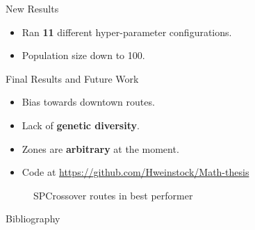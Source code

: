 \documentclass{beamer}
\begin{document}
\begin{frame}{New Results}
\begin{itemize}
    \item Ran \textbf{11} different hyper-parameter configurations. 
    \item Population size down to 100. 
\end{itemize}
\endminipage
{}%
\begin{figure}
\end{figure}
\endminipage
\end{frame}



\begin{frame}{Final Results and Future Work}
\begin{itemize}
    \item Bias towards downtown routes. 
    \item Lack of \textbf{genetic diversity}. 
    \item Zones are \textbf{arbitrary} at the moment.
    \item Code at \url{https://github.com/Hweinstock/Math-thesis}
\end{itemize}
\endminipage \hfill
{}%
\begin{figure}
  \caption{SPCrossover routes in best performer}
\end{figure}

\endminipage
\end{frame}

\appendix



\begin{frame}{Bibliography}
    \printbibliography
\end{frame}
\end{document}
